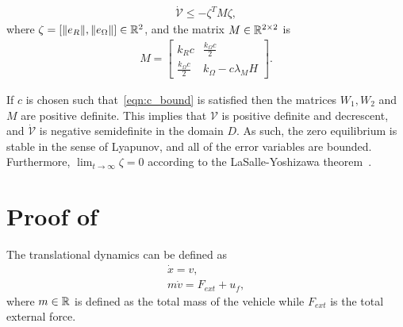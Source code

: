 \begin{gather*}
	\dot{\mathcal{V}} \leq -\zeta^T M \zeta ,
\end{gather*}
where $\zeta=[\|e_R\|,\|e_\Omega\|]\in\mathbb{R}^2$, and the matrix \( M \in \mathbb{R}^{2 \times 2} \) is 
\begin{gather*}
	M = \begin{bmatrix}
		k_R c & \frac{k_\Omega c}{2} \\
		\frac{k_\Omega c}{2} & k_\Omega - c \lambda_M H
	\end{bmatrix}.
\end{gather*}

If \( c \) is chosen such that~\cref{eqn:c_bound} is satisfied then the matrices \( W_1, W_2 \) and \( M \) are positive definite.
This implies that $\mathcal{V}$ is positive definite and decrescent, and $\dot{\mathcal{V}}$ is negative semidefinite in the domain $D$. As such, the zero equilibrium is stable in the sense of Lyapunov, and all of the error variables are bounded. Furthermore, $\lim_{t\to\infty} \zeta=0$ according to the LaSalle-Yoshizawa theorem~\cite{khalil1996}. 

%	
%	

\section{Proof of~}\label{proof:translational_control}
The translational dynamics can be defined as
\begin{align}\label{eq:translation_dynamics_simple}
    \dot{x} = v , \\
    m \dot{v} = F_{ext} + u_f ,
\end{align}
where \( m \in \mathbb{R} \) is defined as the total mass of the vehicle while \( F_{ext} \) is the total external force.

